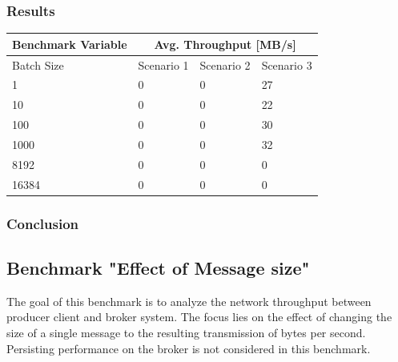 \subsubsection{Results}
\begin{table}[H]
\centering
\begin{tabular}{|l|l|l|l|}
\hline
{\bf Benchmark Variable} & \multicolumn{3}{c|}{{\bf Avg. Throughput {[}MB/s{]}}} \\ \hline
Batch Size               & Scenario 1       & Scenario 2       & Scenario 3      \\ \hline
1                        & 0                & 0                & 27              \\ \hline
10                       & 0                & 0                & 22              \\ \hline
100                      & 0                & 0                & 30              \\ \hline
1000                     & 0                & 0                & 32              \\ \hline
8192                     & 0                & 0                & 0               \\ \hline
16384                    & 0                & 0                & 0               \\ \hline
\end{tabular}
\end{table}

\subsubsection{Conclusion}


\subsection{Benchmark "Effect of Message size"}
The goal of this benchmark is to analyze the network throughput between
producer client and broker system. The focus lies on the effect of changing the
size of a single message to the resulting transmission of bytes per
second. Persisting performance on the broker is not considered in
this benchmark.


